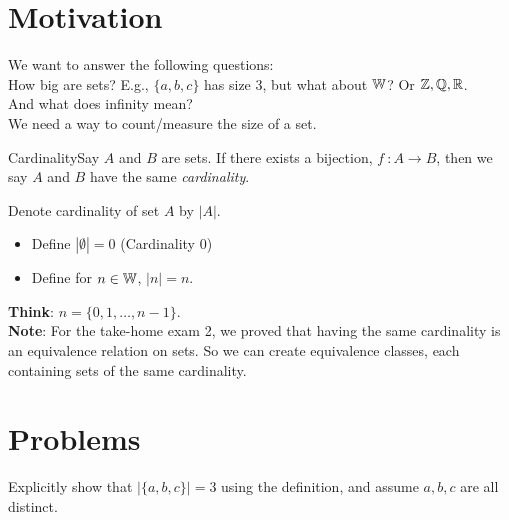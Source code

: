     
        \section*{Motivation}
            We want to answer the following questions: \\
            How big are sets? E.g., \(\{a,b,c\}\) has size 3, but what about \(\mathbb{W}\)? Or \(\mathbb{Z}, \mathbb{Q}, \mathbb{R}\). \\
            And what does infinity mean? \\
            We need a way to count/measure the size of a set.

            \begin{definition}
                {Cardinality}Say \(A\) and \(B\) are sets. If there exists a bijection, \(f \ \colon A \rightarrow B\), then we say \(A\) and \(B\) have the same \textit{cardinality}.

                Denote cardinality of set \(A\) by \(|A|\). 
                \begin{itemize}
                    \item Define \(|\emptyset| = 0\) (Cardinality 0) 
                    \item Define for \(n\in \mathbb{W}\), \(|n| = n\). 
                \end{itemize}
            \end{definition}
            \textbf{Think}: \(n = \{0,1,\dots, n-1\}\). \\
            \textbf{Note}: For the take-home exam 2, we proved that having the same cardinality is an equivalence relation on sets. So we can create equivalence classes, each containing sets of the same cardinality.

        \section{Problems}


            \begin{exercise}
                {}Explicitly show that \(|\{a,b,c\}| = 3\) using the definition, and assume \(a,b,c\) are all distinct.
            \end{exercise}

